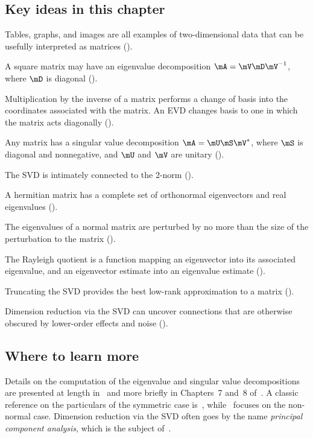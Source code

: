 \clearpage
\subsection*{Key ideas in this chapter}
\begin{remunerate}
\item Tables, graphs, and images are all examples of two-dimensional data that can be usefully interpreted as matrices ().
\item A square matrix may have an eigenvalue decomposition $\mA=\mV\mD\mV^{-1}$, where $\mD$ is diagonal ().
\item Multiplication by the inverse of a matrix performs a change of basis into the coordinates associated with the matrix. An EVD changes basis to one in which the matrix acts diagonally ().
\item Any matrix has a singular value decomposition $\mA=\mU\mS\mV^*$, where $\mS$ is diagonal and nonnegative, and $\mU$ and $\mV$ are unitary ().
\item The SVD is intimately connected to the 2-norm ().
\item A hermitian matrix has a complete set of orthonormal eigenvectors and real eigenvalues ().
\item The eigenvalues of a normal matrix are perturbed by no more than the size of the perturbation to the matrix ().
\item The Rayleigh quotient is a function mapping an eigenvector into its associated eigenvalue, and an eigenvector estimate into an eigenvalue estimate ().
\item Truncating the SVD provides the best low-rank approximation to a matrix ().
\item Dimension reduction via the SVD can uncover connections that are otherwise obscured by lower-order effects and noise ().
\end{remunerate}


\subsection*{Where to learn more}

Details on the computation of the eigenvalue and singular value decompositions are presented at length in~\cite{StewartVol2} and more briefly in Chapters~7 and~8 of~\cite{GolubVan96}. A classic reference on the particulars of the symmetric case is~\cite{Parlett1980}, while~\cite{TrefEmb05} focuses on the non-normal case. Dimension reduction via the SVD often goes by the name \textit{principal component analysis}, which is the subject of~\cite{Jolliffe2002}.




